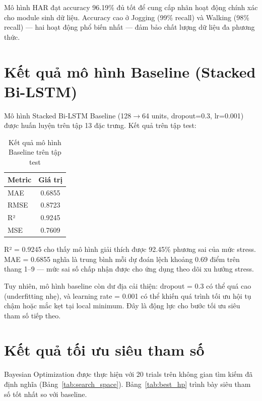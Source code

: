 Mô hình HAR đạt accuracy 96.19\% đủ tốt để cung cấp nhãn hoạt động chính xác cho module sinh dữ liệu. Accuracy cao ở Jogging (99\% recall) và Walking (98\% recall) — hai hoạt động phổ biến nhất — đảm bảo chất lượng dữ liệu đa phương thức.


\section{Kết quả mô hình Baseline (Stacked Bi-LSTM)}
\label{sec:baseline_results}

Mô hình Stacked Bi-LSTM Baseline (128$\to$64 units, dropout=0.3, lr=0.001) được huấn luyện trên tập 13 đặc trưng. Kết quả trên tập test:

\begin{table}[H]
\centering
\caption{Kết quả mô hình Baseline trên tập test}
\label{tab:baseline_test_metrics}
\begin{tabular}{|l|c|}
\hline
\textbf{Metric} & \textbf{Giá trị} \\
\hline
MAE  & 0.6855 \\
RMSE & 0.8723 \\
R²   & 0.9245 \\
MSE  & 0.7609 \\
\hline
\end{tabular}
\end{table}

R² = 0.9245 cho thấy mô hình giải thích được 92.45\% phương sai của mức stress. MAE = 0.6855 nghĩa là trung bình mỗi dự đoán lệch khoảng 0.69 điểm trên thang 1--9 — mức sai số chấp nhận được cho ứng dụng theo dõi xu hướng stress.

Tuy nhiên, mô hình baseline còn dư địa cải thiện: dropout = 0.3 có thể quá cao (underfitting nhẹ), và learning rate = 0.001 có thể khiến quá trình tối ưu hội tụ chậm hoặc mắc kẹt tại local minimum. Đây là động lực cho bước tối ưu siêu tham số tiếp theo.


\section{Kết quả tối ưu siêu tham số}
\label{sec:hp_tuning_results}

Bayesian Optimization được thực hiện với 20 trials trên không gian tìm kiếm đã định nghĩa (Bảng~\ref{tab:search_space}). Bảng~\ref{tab:best_hp} trình bày siêu tham số tốt nhất so với baseline.


